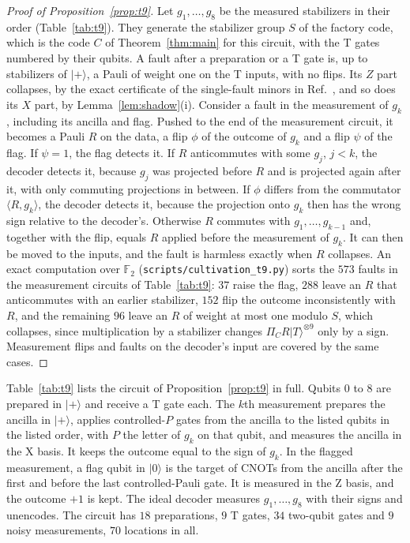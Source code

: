 \documentclass[aps,prl,reprint,twocolumn,amsmath,amssymb,floatfix,nofootinbib,superscriptaddress]{revtex4-2}
\theoremstyle{definition}
\theoremstyle{remark}
\newcommand{\F}{\mathbb F_2}
\begin{document}
\begin{proof}[Proof of Proposition~\ref{prop:t9}]
Let $g_1,\dots,g_8$ be the measured stabilizers in their order (Table~\ref{tab:t9}). They generate the stabilizer group $S$ of the factory code, which is the code $C$ of Theorem~\ref{thm:main} for this circuit, with the T gates numbered by their qubits. A fault after a preparation or a T gate is, up to stabilizers of $|{+}\rangle$, a Pauli of weight one on the T inputs, with no flips. Its $Z$ part collapses, by the exact certificate of the single-fault minors in Ref.~\cite{distillationpaper}, and so does its $X$ part, by Lemma~\ref{lem:shadow}(i). Consider a fault in the measurement of $g_k$, including its ancilla and flag. Pushed to the end of the measurement circuit, it becomes a Pauli $R$ on the data, a flip $\phi$ of the outcome of $g_k$ and a flip $\psi$ of the flag. If $\psi=1$, the flag detects it. If $R$ anticommutes with some $g_j$, $j<k$, the decoder detects it, because $g_j$ was projected before $R$ and is projected again after it, with only commuting projections in between. If $\phi$ differs from the commutator $\langle R,g_k\rangle$, the decoder detects it, because the projection onto $g_k$ then has the wrong sign relative to the decoder's. Otherwise $R$ commutes with $g_1,\dots,g_{k-1}$ and, together with the flip, equals $R$ applied before the measurement of $g_k$. It can then be moved to the inputs, and the fault is harmless exactly when $R$ collapses. An exact computation over $\F$ (\texttt{scripts/cultivation\_t9.py}) sorts the $573$ faults in the measurement circuits of Table~\ref{tab:t9}: $37$ raise the flag, $288$ leave an $R$ that anticommutes with an earlier stabilizer, $152$ flip the outcome inconsistently with $R$, and the remaining $96$ leave an $R$ of weight at most one modulo $S$, which collapses, since multiplication by a stabilizer changes $\Pi_CR|T\rangle^{\otimes9}$ only by a sign. Measurement flips and faults on the decoder's input are covered by the same cases.
\end{proof}

Table~\ref{tab:t9} lists the circuit of Proposition~\ref{prop:t9} in full. Qubits $0$ to $8$ are prepared in $|{+}\rangle$ and receive a T gate each. The $k$th measurement prepares the ancilla in $|{+}\rangle$, applies controlled-$P$ gates from the ancilla to the listed qubits in the listed order, with $P$ the letter of $g_k$ on that qubit, and measures the ancilla in the X basis. It keeps the outcome equal to the sign of $g_k$. In the flagged measurement, a flag qubit in $|0\rangle$ is the target of CNOTs from the ancilla after the first and before the last controlled-Pauli gate. It is measured in the Z basis, and the outcome $+1$ is kept. The ideal decoder measures $g_1,\dots,g_8$ with their signs and unencodes. The circuit has $18$ preparations, $9$ T gates, $34$ two-qubit gates and $9$ noisy measurements, $70$ locations in all.
\end{document}
